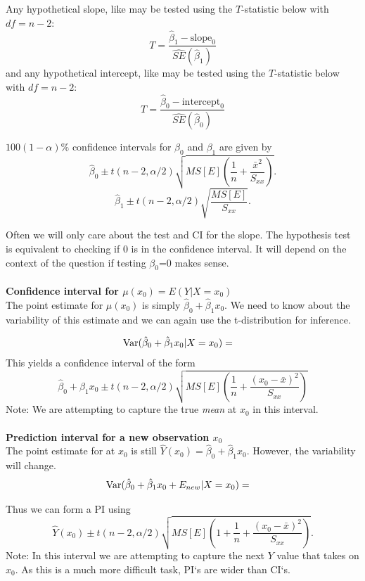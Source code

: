 ~\\~\\
Any hypothetical slope, like  may be tested using the $T$-statistic below with $df=n-2$:
$$ T=\frac{\hat\beta_1-\mbox{slope}_0}{\widehat{SE}(\hat\beta_1)}$$ 
and any hypothetical intercept, like  may be tested using the $T$-statistic below with $df=n-2$:
$$ T=\frac{\hat\beta_0-\mbox{intercept}_0}{\widehat{SE}(\hat\beta_0)}$$ 

$100(1-\alpha)\%$ confidence intervals for $\beta_0$ and $\beta_1$ are 
given by 
$$\hat{\beta}_0 \pm t(n-2,\alpha/2) \sqrt{MS[E]\left(\frac{1}{n}+\frac{\bar{x}^2}{S_{xx}}\right)}. $$
$$\hat{\beta}_1 \pm t(n-2,\alpha/2) \sqrt{\frac{MS[E]}{S_{xx}}}. $$

Often we will only care about the test and CI for the slope.  The hypothesis test is equivalent to checking if 0 is in the confidence interval.  It will depend on the context of the question if testing $\beta_0$=0 makes sense.\\~\\

\textbf{Confidence interval for $\mu(x_0) = E(Y|X=x_0)$}\\
The point estimate for $\mu(x_0)$ is simply $\hat\beta_0+\hat\beta_1x_0$.  We need to know about the variability of this estimate and we can again use the t-distribution for inference.

\begin{eqnarray*}
\mbox{Var}(\hat\beta_0+\hat\beta_1 x_0|X=x_0)
& = & 
\end{eqnarray*}
This yields a confidence interval of the form
$$\hat\beta_0 +\hat\beta_1 x_0 \pm t(n-2,\alpha/2) \sqrt{MS[E]\left(\frac{1}{n}+\frac{(x_0-\bar{x})^2}{S_{xx}}\right)} $$
Note: We are attempting to capture the true \textit{mean} at $x_0$ in this interval.\\~\\

\textbf{Prediction interval for a new observation $x_0$}\\
The point estimate for at $x_0$ is still $\hat{Y}(x_0)=\hat\beta_0+\hat\beta_1x_0$.  However, the variability will change.
\begin{eqnarray*}
\mbox{Var}(\hat\beta_0+\hat\beta_1 x_0+E_{new}|X=x_0)
& = & 
\end{eqnarray*}

Thus we can form a PI using
$$ \hat{Y}(x_0) \pm t(n-2,\alpha/2) \sqrt{MS[E]\left(1+\frac{1}{n}+\frac{(x_0-\bar{x})^2}{S_{xx}}\right)}. $$
Note: In this interval we are attempting to capture the next $Y$ value that takes on $x_0$.  As this is a much more difficult task, PI`s are wider than CI`s.  \\~\\

